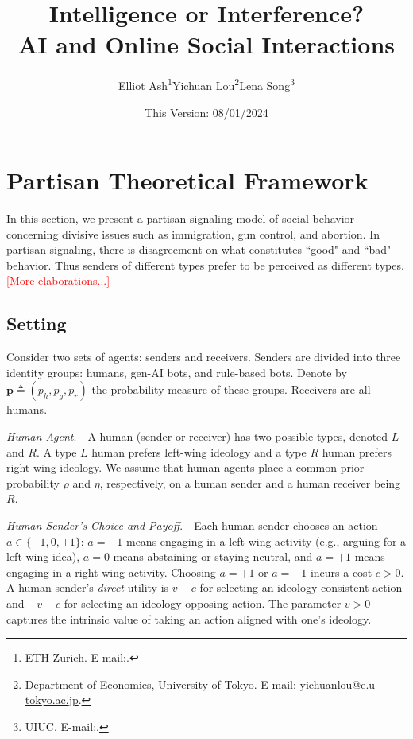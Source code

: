 \documentclass[english,12pt]{article}
\theoremstyle{plain}
\theoremstyle{plain}
\theoremstyle{definition}
\theoremstyle{definition}
\theoremstyle{assumption}
\theoremstyle{plain}
\theoremstyle{plain}
\theoremstyle{plain}
\theoremstyle{plain}
\theoremstyle{definition}%
\theoremstyle{plain}
\theoremstyle{plain}
\theoremstyle{plain}
\theoremstyle{plain}
\theoremstyle{plain}
\theoremstyle{plain}
\begin{document}
\title{Intelligence or Interference?\\ AI and Online Social Interactions}

\author{\large
\begin{tabular}{ccccccccccc}
Elliot Ash\thanks{ETH Zurich. E-mail:.} &&&&&  Yichuan Lou\thanks{Department of Economics, University of Tokyo. E-mail: \url{yichuanlou@e.u-tokyo.ac.jp}.}  &&&&& Lena Song\thanks{UIUC. E-mail:.}
\end{tabular}
}

\date{This Version: 08/01/2024}

\maketitle
\thispagestyle{empty}
\begin{abstract}
\noindent
\end{abstract}



\section{Partisan Theoretical Framework}


In this section, we present a partisan signaling model of social behavior concerning divisive issues such as immigration, gun control, and abortion. In partisan signaling, there is disagreement on what constitutes ``good" and ``bad" behavior. Thus senders of different types prefer to be perceived as different types. \textcolor{red}{[More elaborations...]}

\subsection{Setting}

Consider two sets of agents: senders and receivers. Senders are divided into three identity groups: humans, gen-AI bots, and rule-based bots. Denote by $\bm{p} \triangleq (p_h,p_g,p_r)$ the probability measure of these groups. Receivers are all humans.

\textit{Human Agent}.---A human (sender or receiver) has two possible types, denoted $L$ and $R$. A type $L$ human prefers left-wing ideology and a type $R$ human prefers right-wing ideology. We assume that human agents place a common prior probability $\rho$ and $\eta$, respectively, on a human sender and a human receiver being $R$.

\textit{Human Sender's Choice and Payoff}.---Each human sender chooses an action $a\in \{-1,0,+1\}$: $a=-1$ means engaging in a left-wing activity (e.g., arguing for a left-wing idea), $a=0$ means abstaining or staying neutral, and $a=+1$ means engaging in a right-wing activity. Choosing $a=+1$ or $a=-1$ incurs a cost $c>0$. A human sender's \textit{direct} utility is $v-c$ for selecting an ideology-consistent action and $-v-c$ for selecting an ideology-opposing action. The parameter $v>0$ captures the intrinsic value of taking an action aligned with one's ideology.
\end{document}
